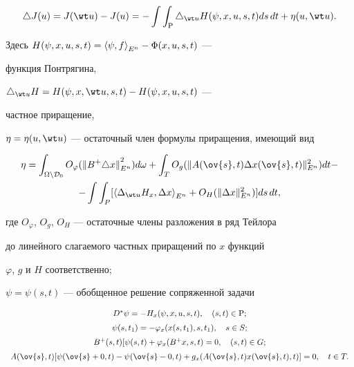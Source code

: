 \begin{equation}


\triangle J(u) = J(\wt u) - J(u) =


-\int \int_{\P} \triangle_{\wt u}


H(\psi,x,u,s,t)ds\,dt + \eta(u,\wt u).


\end{equation}


Здесь $H(\psi,x,u,s,t)={\langle \psi,f\rangle}_{E^n} - \Phi(x,u,s,t)$ ---


функция Понтрягина,


$\triangle_{\wt u} H = H(\psi,x,\wt u,s,t) - H(\psi,x,u,s,t)$ ---


частное приращение,


$\eta = \eta(u,\wt u)$ --- остаточный член формулы приращения, имеющий вид


\begin{multline}


\eta = \int_{\Omega \setminus {\cal D}_0} O_\varphi ({\| B^+


\triangle x \| }^{2}_{E^n})d \omega +


\int_{T} O_g ( \| A(\ov{s},t)\Delta{x}(\ov{s},t)\|^{2}_{E^n})dt - \\


%


- \int \int_{P}[{\la \Delta_{\wt u} H_x,\Delta x\ra}_{E^n} +


O_H ( \| \Delta x \|^{2}_{E^n} )]ds\,dt,


\end{multline}


где $O_\varphi$, $O_g$, $O_H$ --- остаточные члены разложения в ряд Тейлора


до линейного слагаемого частных приращений по $x$ функций


$\varphi$, $g$ и $H$ соответственно;


$\psi = \psi(s,t)$ --- обобщенное решение сопряженной задачи


\begin{equation}


\begin{array}{c}


D^{*}\psi = - H_{x} (\psi,x,u,s,t), \quad (s,t) \in {\P}; \\[2mm]


\psi(s,t_{1}) = - \varphi_{x}(x(s,t_{1}),s,t_{1}), \quad s \in S; \\[2mm]


B^{+}(s,t)[\psi(s,t) + \varphi_{x}(B^{+}x,s,t) = 0, \quad


(s,t) \in G; \\[2mm]


A(\ov{s},t)[\psi(\ov{s} + 0,t) - \psi(\ov{s} - 0,t) +


g_{x}(A(\ov{s},t)x(\ov{s},t),t)] = 0, \quad t \in T.


\end{array}


\end{equation}





